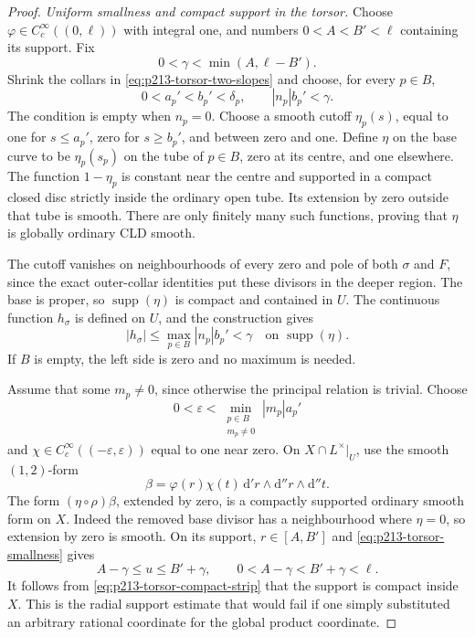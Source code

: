 \begin{proof}
\emph{Uniform smallness and compact support in the torsor.}
Choose \(\varphi\in C_c^\infty((0,\ell))\) with integral
one, and numbers \(0<A<B'<\ell\) containing its support.
Fix
\[
 0<\gamma<\min(A,\ell-B').
\]
Shrink the collars in \eqref{eq:p213-torsor-two-slopes}
and choose, for every \(p\in B\),
\[
 0<a_p'<b_p'<\delta_p,\qquad |n_p|b_p'<\gamma.
\]
The condition is empty when \(n_p=0\).
Choose a smooth cutoff \(\eta_p(s)\), equal to one for
\(s\leq a_p'\), zero for \(s\geq b_p'\), and between zero
and one. Define \(\eta\) on the base curve to be
\(\eta_p(s_p)\) on the tube of \(p\in B\), zero at its
centre, and one elsewhere.
The function \(1-\eta_p\) is constant near the centre
and supported in a compact closed disc strictly
inside the ordinary open tube. Its extension by zero
outside that tube is smooth. There are only finitely
many such functions, proving that \(\eta\) is globally
ordinary CLD smooth.

The cutoff vanishes on neighbourhoods of every zero
and pole of both \(\sigma\) and \(F\), since the exact
outer-collar identities put these divisors in the
deeper region. The base is proper, so
\(\operatorname{supp}(\eta)\) is compact and contained
in \(U\). The continuous function \(h_\sigma\) is
defined on \(U\), and the construction gives
\begin{equation}
\label{eq:p213-torsor-smallness}
 |h_\sigma|\leq\max_{p\in B}|n_p|b_p'<\gamma
       \quad\text{on }\operatorname{supp}(\eta).
\end{equation}
If \(B\) is empty, the left side is zero and no maximum
is needed.

Assume that some \(m_p\neq0\), since otherwise the
principal relation is trivial. Choose
\[
 0<\varepsilon<
     \min_{\substack{p\in B\\m_p\neq0}}|m_p|a_p'
\]
and \(\chi\in C_c^\infty((-\varepsilon,\varepsilon))\)
equal to one near zero. On \(X\cap L^\times|_U\), use
the smooth \((1,2)\)-form
\[
 \beta=\varphi(r)\chi(t)\,
             \mathrm d'r\wedge\mathrm d''r\wedge\mathrm d''t.
\]
The form \((\eta\circ\rho)\beta\), extended by zero,
is a compactly supported ordinary smooth form on \(X\).
Indeed the removed base divisor has a neighbourhood
where \(\eta=0\), so extension by zero is smooth.
On its support, \(r\in[A,B']\) and
\eqref{eq:p213-torsor-smallness} gives
\[
 A-\gamma\leq u\leq B'+\gamma,
 \qquad 0<A-\gamma<B'+\gamma<\ell.
\]
It follows from \eqref{eq:p213-torsor-compact-strip}
that the support is compact inside \(X\).
This is the radial support estimate that would fail
if one simply substituted an arbitrary rational
coordinate for the global product coordinate.


\end{proof}
